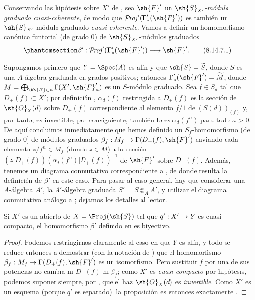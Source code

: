 \documentclass[oneside,10pt]{amsart}
\makeatletter
\newcommand{\ega@arrow}[2]{\mathchoice{#1}{#2}{#2}{#2}}
\renewcommand{\to}{\ega@arrow{\longrightarrow}{\rightarrow}}
\def\shProj{\mathcal{P}\!\mathit{roj}}
\newcommand{\oldpage}[2][]{\marginnote{\normalfont\footnotesize\textbf{#1}~|~#2}\ignorespaces}
\let\EGAOriginalLabel\label
\renewcommand{\label}[1]{\phantomsection\EGAOriginalLabel{#1}}
\makeatother
\begin{document}
\begin{env}[8.14.7]
\label{II.8.14.7}
Conservando las hipótesis sobre $X'$ de , sea $\sh{F}'$ un \emph{$\sh{S}_{X'}$-módulo graduado cuasi-coherente}, de modo que $\shProj'(\boldsymbol{\Gamma}'_*(\sh{F}'))$ es también un $\sh{S}_{X'}$-módulo graduado \emph{cuasi-coherente}.
\oldpage[II]{200}
Vamos a definir un homomorfismo canónico funtorial (de grado $0$) de $\sh{S}_{X'}$-módulos graduados
\[
\label{II.8.14.7.1}
    \beta': \shProj'(\boldsymbol{\Gamma}'_*(\sh{F}')) \to \sh{F}'.
\tag{8.14.7.1}
\]

Supongamos primero que $Y=\Spec(A)$ es afín y que $\sh{S}=\widetilde{S}$, donde $S$ es una $A$-álgebra graduada en grados positivos;
entonces $\boldsymbol{\Gamma}'_*(\sh{F}')=\widetilde{M}$, donde $M=\bigoplus_{\bb{Z}\in n}\Gamma(X',\sh{F}'_n)$ es un $S$-módulo graduado.
Sea $f\in S_d$ tal que $D_+(f)\subset X'$;
por definición , $\alpha_d(f)$ restringida a $D_+(f)$ es la sección de $\sh{O}_X(d)$ sobre $D_+(f)$ correspondiente al elemento $f/1$ de $(S(d))_{(f)}$ y, por tanto, es invertible;
por consiguiente, también lo es $\alpha_d(f^n)$ para todo $n>0$.
De aquí concluimos inmediatamente que hemos definido un $S_f$-homomorfismo (de grado $0$) de módulos graduados $\beta_f:M_f\to\Gamma(D_+(f),\sh{F}')$ enviando cada elemento $z/f^n\in M_f$ (donde $z\in M$) a la sección $(z|D_+(f))(\alpha_d(f^n)|D_+(f))^{-1}$ de $\sh{F}'$ sobre $D_+(f)$.
Además, tenemos un diagrama conmutativo correspondiente a , de donde resulta la definición de $\beta'$ en este caso.
Para pasar al caso general, hay que considerar una $A$-álgebra $A'$, la $A'$-álgebra graduada $S'=S\otimes_A A'$, y utilizar el diagrama conmutativo análogo a ;
dejamos los detalles al lector.
\end{env}

\begin{proposition}[8.14.8]
\label{II.8.14.8}
Si $X'$ es un abierto de $X=\Proj(\sh{S})$ tal que $q':X'\to Y$ es cuasi-compacto, el homomorfismo $\beta'$ definido en \textup{} es biyectivo.
\end{proposition}

\begin{proof}
Podemos restringirnos claramente al caso en que $Y$ es afín, y todo se reduce entonces a demostrar (con la notación de ) que el homomorfismo $\beta_f:M_f\to\Gamma(D_+(f),\sh{F}')$ es un isomorfismo.
Pero sustituir $f$ por una de sus potencias no cambia ni $D_+(f)$ ni $\beta_f$;
como $X'$ es \emph{cuasi-compacto} por hipótesis, podemos suponer siempre, por , que el haz $\sh{O}_X(d)$ es \emph{invertible}.
Como $X'$ es un esquema (porque $q'$ es separado), la proposición es entonces exactamente .
\end{proof}
\end{document}
